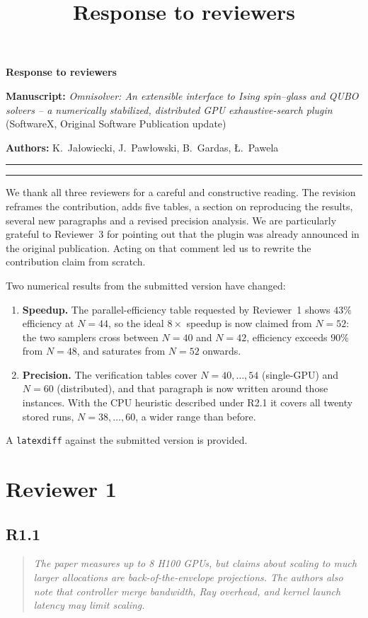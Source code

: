 \documentclass[11pt,a4paper]{article}
\title{Response to reviewers}
\author{}
\date{}
\newenvironment{reviewercomment}
  {\begin{quote}\itshape\small}
  {\end{quote}}
\newcommand{\point}[2]{%
  \subsection*{#1}%
  \begin{reviewercomment}#2\end{reviewercomment}}
\begin{document}
\begin{center}
{\LARGE\bfseries Response to reviewers}\par\medskip
\end{center}

\textbf{Manuscript:} \emph{Omnisolver: An extensible interface to Ising spin--glass and QUBO
solvers -- a numerically stabilized, distributed GPU exhaustive-search plugin} (SoftwareX,
Original Software Publication update)

\textbf{Authors:} K.~Ja\l{}owiecki, J.~Paw\l{}owski, B.~Gardas, \L{}.~Pawela

\hrule

\hrule

We thank all three reviewers for a careful and constructive reading. The revision reframes the
contribution, adds five tables, a section on reproducing the results, several new paragraphs
and a revised precision analysis. We are particularly grateful to Reviewer~3 for pointing out
that the plugin was already announced in the original publication. Acting on that comment led
us to rewrite the contribution claim from scratch.

Two numerical results from the submitted version have changed:

\begin{enumerate}[leftmargin=*]
\item \textbf{Speedup.} The parallel-efficiency table requested by Reviewer~1 shows $43\%$
efficiency at $N=44$, so the ideal $8\times$ speedup is now claimed from $N=52$: the two samplers
cross between $N=40$ and $N=42$, efficiency exceeds $90\%$ from $N=48$, and saturates from
$N=52$ onwards.
\item \textbf{Precision.} The verification tables cover $N=40,\dots,54$ (single-GPU) and $N=60$
(distributed), and that paragraph is now written around those instances. With the CPU heuristic
described under R2.1 it covers all twenty stored runs, $N=38,\dots,60$, a wider range than
before.
\end{enumerate}

A \texttt{latexdiff} against the submitted version is provided.

\section*{Reviewer 1}

\point{R1.1}{The paper measures up to 8 H100 GPUs, but claims about scaling to much larger
allocations are back-of-the-envelope projections. The authors also note that controller merge
bandwidth, Ray overhead, and kernel launch latency may limit scaling.}
\end{document}
